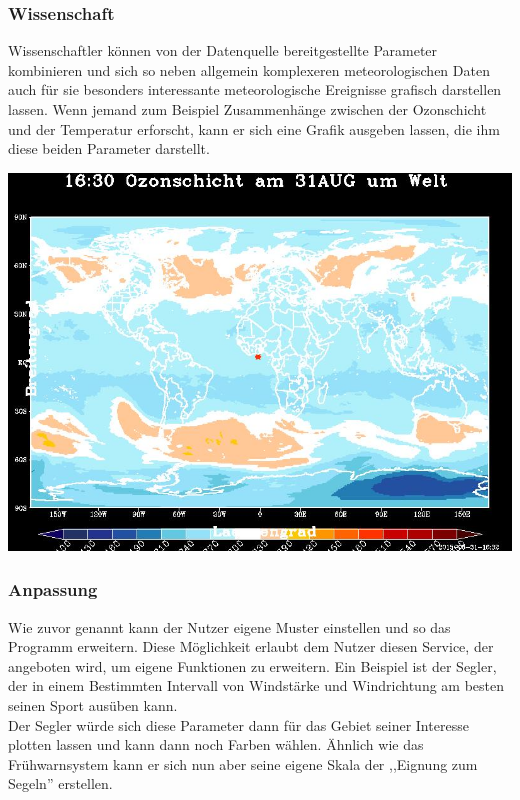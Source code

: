 \subsubsection{Wissenschaft} %
Wissenschaftler können von der Datenquelle bereitgestellte Parameter kombinieren
und sich so neben allgemein komplexeren meteorologischen Daten
auch für sie besonders interessante meteorologische Ereignisse grafisch darstellen lassen.
Wenn jemand zum Beispiel Zusammenhänge zwischen der Ozonschicht und der Temperatur erforscht,
kann er sich eine Grafik ausgeben lassen, die ihm diese beiden Parameter darstellt.
\begin{center}
	\includegraphics[width=\linewidth]{imgs/gl/to3_0013.jpg}
\end{center}

\subsubsection{Anpassung} %
Wie zuvor genannt kann der Nutzer eigene Muster einstellen und so das Programm erweitern.
Diese Möglichkeit erlaubt dem Nutzer diesen Service,
der angeboten wird, um eigene Funktionen zu erweitern.
Ein Beispiel ist der Segler, der in einem Bestimmten
Intervall von Windstärke und Windrichtung am besten seinen Sport ausüben kann.\\
Der Segler würde sich diese Parameter dann für das Gebiet seiner
Interesse plotten lassen und kann dann noch Farben wählen.
Ähnlich wie das Frühwarnsystem kann er sich nun aber
seine eigene Skala der ,,Eignung zum Segeln'' erstellen.

